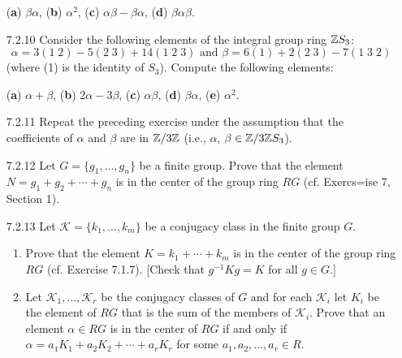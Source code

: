 \begin{enumerate}
                  (\textbf{a}) $\beta\alpha$, \quad (\textbf{b}) $\alpha^2$,
                  \quad (\textbf{c}) $\alpha\beta - \beta\alpha$, \quad
                  (\textbf{d}) $\beta\alpha\beta$.
   \item[7.2.10]  Consider the following elements of the integral group ring
                  $\mathbb{Z} S_3$:
                  $$\alpha = 3(1\;2) - 5(2\;3) + 14(1\;2\;3) \text{ and }
                    \beta = 6(1) + 2(2\;3) - 7(1\;3\;2)$$
                  (where (1) is the identity of $S_3$). Compute the following
                  elements:
            
                  (\textbf{a}) $\alpha + \beta$, \quad
                  (\textbf{b}) $2\alpha - 3\beta$, \quad
                  (\textbf{c}) $\alpha\beta$, \quad
                  (\textbf{d}) $\beta\alpha$,
                  (\textbf{e}) $\alpha^2$.
   \item[7.2.11]  Repeat the preceding exercise under the assumption that the
                  coefficients of $\alpha$ and $\beta$ are in $\mathbb{Z}/3\mathbb{Z}$ (i.e.,
                  $\alpha$, $\beta \in \mathbb{Z}/3\mathbb{Z} S_3$).
   \item[7.2.12]  Let $G = \{g_1, \ldots, g_n\}$ be a finite group. Prove that
                  the element $N = g_1 + g_2 + \cdots + g_n$ is in the center of
                  the group ring $RG$ (cf. Exercs=ise 7, Section 1).
   \item[7.2.13]  Let $\mathcal{K} = \{k_1, \ldots, k_m\}$ be a conjugacy class
                  in the finite group $G$.
                  \begin{enumerate}
                     \item Prove that the element $K = k_1 + \cdots + k_m$ is in
                           the center of the group ring $RG$
                           (cf. Exercise 7.1.7). [Check that $g^{-1}Kg = K$ for
                           all $g \in G$.]
                     \item Let $\mathcal{K}_1, \ldots, \mathcal{K}_r$ be the
                           conjugacy classes of $G$ and for each $\mathcal{K}_i$
                           let $K_i$ be the element of $RG$ that is the sum of
                           the members of $\mathcal{K}_i$. Prove that an element
                           $\alpha \in RG$ is in the center of $RG$ if and only
                           if $\alpha = a_1K_1 + a_2K_2 + \cdots + a_rK_r$ for
                           some $a_1, a_2, \ldots, a_r \in R$.
                  \end{enumerate}
\end{enumerate}
